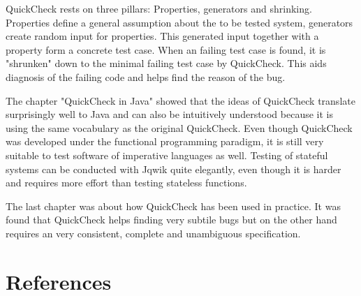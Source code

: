 \documentclass[a4paper, 12pt]{article} %
\begin{document}

QuickCheck rests on three pillars: Properties, generators and shrinking. Properties define a general assumption about the to be tested system, generators create random input for properties. This generated input together with a property form a concrete test case. When an failing test case is found, it is "shrunken" down to the minimal failing test case by QuickCheck. This aids diagnosis of the failing code and helps find the reason of the bug. 


The chapter "QuickCheck in Java" showed that the ideas of QuickCheck translate surprisingly well to Java and can also be intuitively understood because it is using the same vocabulary as the original QuickCheck. Even though QuickCheck was developed under the functional programming paradigm, it is still very suitable to test software of imperative languages as well. Testing of stateful systems can be conducted with Jqwik quite elegantly, even though it is harder and requires more effort than testing stateless functions.


The last chapter was about how QuickCheck has been used in practice. It was found that QuickCheck helps finding very subtile bugs but on the other hand requires an very consistent, complete and unambiguous specification. 


\newpage
\section{References}
\printbibliography[heading=none]
\end{document}

